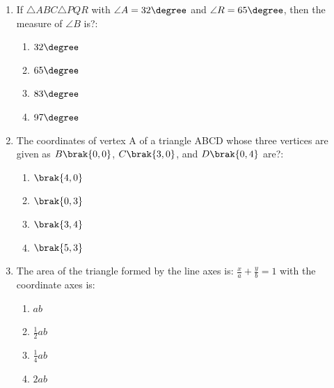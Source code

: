 \begin{enumerate}
\item If $\triangle ABC  \triangle PQR$ with $\angle A = 32\degree $ and $\angle R = 65\degree$, then the measure of $\angle B$ is?:
\begin{enumerate}
\item $ 32\degree $                                                
\item $ 65\degree $                                            
\item $ 83\degree $                                
\item $ 97\degree $
\end{enumerate}


\item  The coordinates of vertex A of a triangle ABCD whose three vertices are given as $B\brak{0,0}$, $C\brak{3,0}$, and $D\brak{0,4}$ are?:  
    \begin{enumerate}
    \item $  \brak{4,0} $                      
    \item $  \brak{0,3} $                          
    \item $  \brak{3,4} $                                  
    \item $  \brak{5,3} $
    \end{enumerate}
    \item The area of the triangle formed by the line axes is: $\frac{x}{a} +\frac{y}{b} = 1$ with the coordinate axes is:  
    \begin{enumerate}
    \item $ ab $                                    
    \item $ \frac{1}{2}ab $        
    \item $ \frac{1}{4}ab $              
    \item $ 2ab $
    \end{enumerate}


\end{enumerate}
